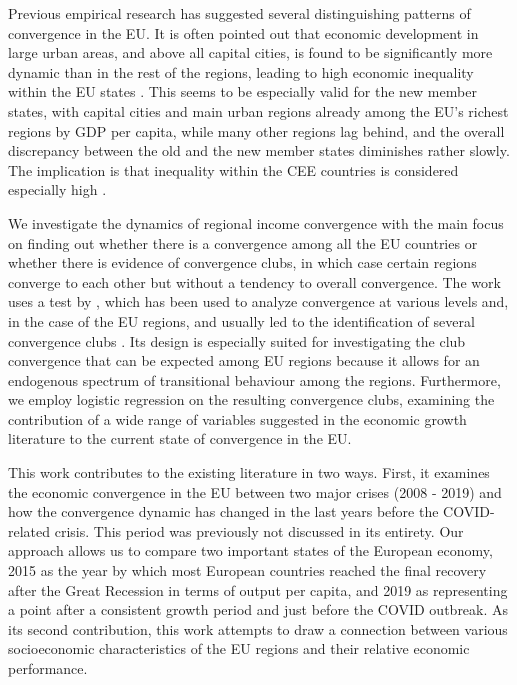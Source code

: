 \documentclass[11pt]{article}
\begin{document}
Previous empirical research has suggested several distinguishing patterns of convergence in the EU. It is often pointed out that economic development in large urban areas, and above all capital cities, is found to be significantly more dynamic than in the rest of the regions, leading to high economic inequality within the EU states \citep{geppert2008regional}. This seems to be especially valid for the new member states, with capital cities and main urban regions already among the EU's richest regions by GDP per capita, while many other regions lag behind, and the overall discrepancy between the old and the new member states diminishes rather slowly. The implication is that inequality within the CEE countries is considered especially high \citep{geppert2008regional,sme2012regional, smketkowski2013regional}.


We investigate the dynamics of regional income convergence with the main focus on finding out whether there is a convergence among all the EU countries or whether there is evidence of convergence clubs, in which case certain regions converge to each other but without a tendency to overall convergence. The work uses a test by \citet{phillips2007transition}, which has been used to analyze convergence at various levels and, in the case of the EU regions, and usually led to the identification of several convergence clubs \citep{bartkowska2012regional, borsi2015evolution, von2017regional}. Its design is especially suited for investigating the club convergence that can be expected among EU regions because it allows for an endogenous spectrum of transitional behaviour among the regions. Furthermore, we employ logistic regression on the resulting convergence clubs, examining the contribution of a wide range of variables suggested in the economic growth literature to the current state of convergence in the EU.

This work contributes to the existing literature in two ways. First, it examines the economic convergence in the EU between two major crises (2008 - 2019) and how the convergence dynamic has changed in the last years before the COVID-related crisis. This period was previously not discussed in its entirety. Our approach allows us to compare two important states of the European economy, 2015 as the year by which most European countries reached the final recovery after the Great Recession in terms of output per capita, and 2019 as representing a point after a consistent growth period and just before the COVID outbreak. As its second contribution, this work attempts to draw a connection between various socioeconomic characteristics of the EU regions and their relative economic performance.
\end{document}

